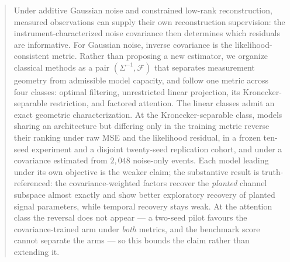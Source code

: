 \begin{abstract}
Under additive Gaussian noise and constrained low-rank reconstruction, measured observations can supply their own reconstruction supervision: the instrument-characterized noise covariance then determines which residuals are informative. For Gaussian noise, inverse covariance is the likelihood-consistent metric. Rather than proposing a new estimator, we organize classical methods as a pair $(\Sigma^{-1},\mathcal{F})$ that separates measurement geometry from admissible model capacity, and follow one metric across four classes: optimal filtering, unrestricted linear projection, its Kronecker-separable restriction, and factored attention. The linear classes admit an exact geometric characterization. At the Kronecker-separable class, models sharing an architecture but differing only in the training metric reverse their ranking under raw MSE and the likelihood residual, in a frozen ten-seed experiment and a disjoint twenty-seed replication cohort, and under a covariance estimated from $2{,}048$ noise-only events. Each model leading under its own objective is the weaker claim; the substantive result is truth-referenced: the covariance-weighted factors recover the \emph{planted} channel subspace almost exactly and show better exploratory recovery of planted signal parameters, while temporal recovery stays weak. At the attention class the reversal does not appear --- a two-seed pilot favours the covariance-trained arm under \emph{both} metrics, and the benchmark score cannot separate the arms --- so this bounds the claim rather than extending it.
\end{abstract}
